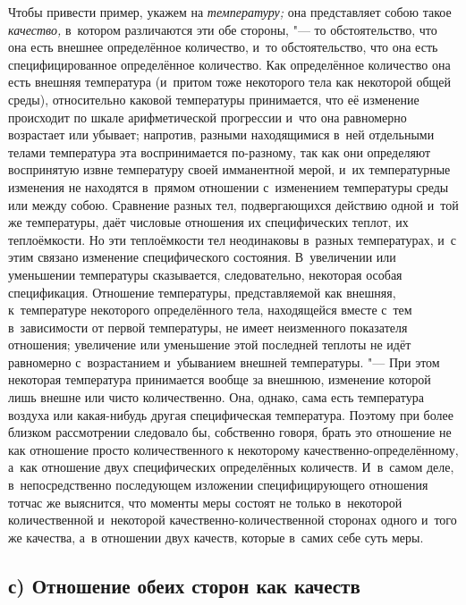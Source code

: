 Чтобы привести пример, укажем на {\em температуру;} она представляет собою
такое {\em качество,} в~котором различаются эти обе стороны, "--- то
обстоятельство, что она есть внешнее определённое количество, и~то
обстоятельство, что она есть специфицированное определённое количество. Как
определённое количество она есть внешняя температура (и~притом тоже некоторого
тела как некоторой общей среды), относительно каковой температуры принимается,
что её изменение происходит по шкале арифметической прогрессии и~что она
равномерно возрастает или убывает; напротив, разными находящимися в~ней
отдельными телами температура эта воспринимается по-разному, так как они
определяют воспринятую извне температуру своей имманентной мерой, и~их
температурные изменения не находятся в~прямом отношении с~изменением
температуры среды или между собою. Сравнение разных тел, подвергающихся
действию одной и~той же температуры, даёт числовые отношения их специфических
теплот, их теплоёмкости. Но эти теплоёмкости тел неодинаковы в~разных
температурах, и~с этим связано изменение специфического состояния. В~увеличении
или уменьшении температуры сказывается, следовательно, некоторая особая
спецификация. Отношение температуры, представляемой как внешняя, к~температуре
некоторого определённого тела, находящейся вместе с~тем в~зависимости от первой
температуры, не имеет неизменного показателя отношения; увеличение или
уменьшение этой последней теплоты не идёт равномерно с~возрастанием и~убыванием
внешней температуры. "--- При этом некоторая температура принимается вообще за
внешнюю, изменение которой лишь внешне или чисто количественно. Она, однако,
сама есть температура воздуха или какая-нибудь другая специфическая
температура. Поэтому при более близком рассмотрении следовало бы, собственно
говоря, брать это отношение не как отношение просто количественного к
некоторому качественно-определённому, а~как отношение двух специфических
определённых количеств. И~в~самом деле, в~непосредственно последующем изложении
специфицирующего отношения тотчас же выяснится, что моменты меры состоят не
только в~некоторой количественной и~некоторой качественно-количественной
сторонах одного и~того же качества, а~в отношении двух качеств, которые в~самих
себе суть меры.

\subsection[с) Отношение обеих сторон как качеств]%
{с) Отношение обеих сторон как качеств}

